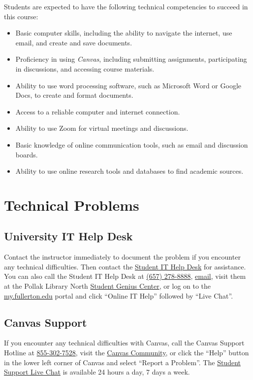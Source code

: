 \documentclass[11pt, letterpaper]{article}
\begin{document}
Students are expected to have the following technical competencies to succeed in this course:
\begin{itemize}
    \item Basic computer skills, including the ability to navigate the internet, use email, and create and save documents.
    \item Proficiency in using \emph{Canvas}, including submitting assignments, participating in discussions, and accessing course materials.
    \item Ability to use word processing software, such as Microsoft Word or Google Docs, to create and format documents.
    \item Access to a reliable computer and internet connection.
    \item Ability to use Zoom for virtual meetings and discussions.
    \item Basic knowledge of online communication tools, such as email and discussion boards.
    \item Ability to use online research tools and databases to find academic sources.
\end{itemize}

\section{Technical Problems}

\subsection*{University IT Help Desk}

Contact the instructor immediately to document the problem if you encounter any technical difficulties. Then contact the \href{http://www.fullerton.edu/it/students/helpdesk/index.php}{Student IT Help Desk} for assistance. You can also call the Student IT Help Desk at \href{tel:+16572788888}{(657) 278-8888}, \href{mailto:StudentITHelpDesk@fullerton.edu}{email}, visit them at the Pollak Library North \href{http://www.fullerton.edu/it/students/sgc/index.php}{Student Genius Center}, or log on to the \href{http://my.fullerton.edu/}{my.fullerton.edu} portal and click ``Online IT Help'' followed by ``Live Chat''.

\subsection*{Canvas Support}

If you encounter any technical difficulties with Canvas, call the Canvas Support Hotline at \href{tel:+18553027528}{855-302-7528}, visit the \href{https://community.canvaslms.com/docs/DOC-10720-67952720329}{Canvas Community}, or click the ``Help'' button in the lower left corner of Canvas and select ``Report a Problem''. The \href{https://cases.canvaslms.com/liveagentchat?chattype=student&sfid=001A000000YzcwQIAR}{Student Support Live Chat} is available 24 hours a day, 7 days a week.
\end{document}
